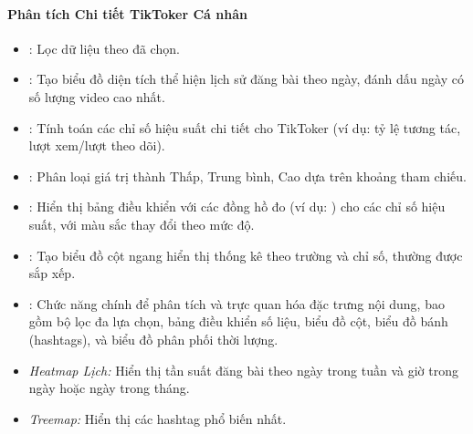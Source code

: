 \paragraph{Phân tích Chi tiết TikToker Cá nhân}
\begin{itemize}
    \item {}: Lọc dữ liệu theo  đã chọn.
    
    \item {}: Tạo biểu đồ diện tích thể hiện lịch sử đăng bài theo ngày, đánh dấu ngày có số lượng video cao nhất.
    
    \item {}: Tính toán các chỉ số hiệu suất chi tiết cho TikToker (ví dụ: tỷ lệ tương tác, lượt xem/lượt theo dõi).
    
    \item {}: Phân loại giá trị thành Thấp, Trung bình, Cao dựa trên khoảng tham chiếu.
    
    \item {}: Hiển thị bảng điều khiển với các đồng hồ đo (ví dụ: ) cho các chỉ số hiệu suất, với màu sắc thay đổi theo mức độ.
    
    \item {}: Tạo biểu đồ cột ngang hiển thị thống kê theo trường và chỉ số, thường được sắp xếp.
    
    \item {}: Chức năng chính để phân tích và trực quan hóa đặc trưng nội dung, bao gồm bộ lọc đa lựa chọn, bảng điều khiển số liệu, biểu đồ cột, biểu đồ bánh (hashtags), và biểu đồ phân phối thời lượng.
    
    \item \textit{Heatmap Lịch:} Hiển thị tần suất đăng bài theo ngày trong tuần và giờ trong ngày hoặc ngày trong tháng.
    
    \item \textit{Treemap:} Hiển thị các hashtag phổ biến nhất.
\end{itemize}

